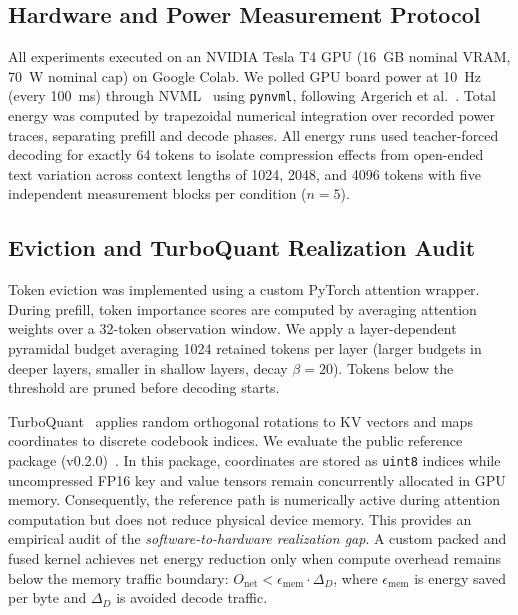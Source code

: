 \documentclass[sigconf,nonacm]{acmart}
\begin{document}
\subsection{Hardware and Power Measurement Protocol}
All experiments executed on an NVIDIA Tesla T4 GPU (16~GB nominal VRAM, 70~W nominal cap) on Google Colab. We polled GPU board power at 10~Hz (every 100~ms) through NVML~\cite{nvidia2024nvml} using \texttt{pynvml}, following Argerich et al.~\cite{argerich_watt_2026}. Total energy was computed by trapezoidal numerical integration over recorded power traces, separating prefill and decode phases. All energy runs used teacher-forced decoding for exactly 64 tokens to isolate compression effects from open-ended text variation across context lengths of 1024, 2048, and 4096 tokens with five independent measurement blocks per condition ($n=5$).

\subsection{Eviction and TurboQuant Realization Audit}
Token eviction was implemented using a custom PyTorch attention wrapper. During prefill, token importance scores are computed by averaging attention weights over a 32-token observation window. We apply a layer-dependent pyramidal budget averaging 1024 retained tokens per layer (larger budgets in deeper layers, smaller in shallow layers, decay $\beta=20$). Tokens below the threshold are pruned before decoding starts.

TurboQuant~\cite{zandieh2026turboquant} applies random orthogonal rotations to KV vectors and maps coordinates to discrete codebook indices. We evaluate the public reference package (v0.2.0)~\cite{zandieh_turboquant_v020}. In this package, coordinates are stored as \texttt{uint8} indices while uncompressed FP16 key and value tensors remain concurrently allocated in GPU memory. Consequently, the reference path is numerically active during attention computation but does not reduce physical device memory. This provides an empirical audit of the \emph{software-to-hardware realization gap}. A custom packed and fused kernel achieves net energy reduction only when compute overhead remains below the memory traffic boundary: $O_\text{net} < \epsilon_\text{mem} \cdot \Delta_D$, where $\epsilon_\text{mem}$ is energy saved per byte and $\Delta_D$ is avoided decode traffic.
\end{document}
